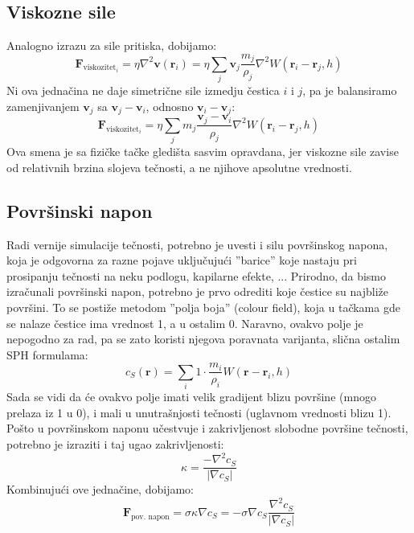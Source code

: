 \documentclass[12pt]{article}
\renewcommand{\vec}[1]{\mathbf{#1}}
\begin{document}
    \subsection{Viskozne sile}
        Analogno izrazu za sile pritiska, dobijamo:
        \begin{equation}\label{eq:SPH interpolacija sile viskoziteta (original)}
        \vec{F}_{\text{viskozitet}_i} = \eta\nabla^2 \vec{v}(\vec{r}_i)=\eta\sum_j \vec{v}_j \frac{m_j}{\rho_j}\nabla^2 W(\vec{r}_i-\vec{r}_j, h)
        \end{equation}
        Ni ova jedna\v cina ne daje simetri\v cne sile izmedju \v cestica $i$ i $j$, pa je balansiramo zamenjivanjem $\vec{v}_j$ sa $\vec{v}_j-\vec{v}_i$, odnosno $\vec{v}_i-\vec{v}_j$:
        \begin{equation}\label{eq:SPH interpolacija sile viskoziteta (simetricno)}
        \vec{F}_{\text{viskozitet}_i}=\eta\sum_j m_j \frac{\vec{v}_j-\vec{v}_i}{\rho_j}\nabla^2 W(\vec{r}_i-\vec{r}_j, h)
        \end{equation}
        Ova smena je sa fizi\v cke ta\v cke gledi\v sta sasvim opravdana, jer viskozne sile zavise od relativnih brzina slojeva te\v cnosti, a ne njihove apsolutne vrednosti.
    \subsection{Povr\v sinski napon}
        Radi vernije simulacije te\v cnosti, potrebno je uvesti i silu povr\v sinskog napona, koja je odgovorna za razne pojave uklju\v cuju\'ci ''barice'' koje nastaju pri prosipanju te\v cnosti na neku podlogu, kapilarne efekte, ... Prirodno, da bismo izra\v cunali povr\v sinski napon, potrebno je prvo odrediti koje \v cestice su najbli\v ze povr\v sini. To se posti\v ze metodom ''polja boja'' (colour field), koja u ta\v ckama gde se nalaze \v cestice ima vrednost 1, a u ostalim 0. Naravno, ovakvo polje je nepogodno za rad, pa se zato koristi njegova poravnata varijanta, sli\v cna ostalim SPH formulama:
        \begin{equation}\label{eq:SPH interpolacija polja boja}
        c_S(\vec{r}) = \sum_i 1\cdot\frac{m_i}{\rho_i}W(\vec{r}-\vec{r}_i, h)
        \end{equation}
        Sada se vidi da \'ce ovakvo polje imati velik gradijent blizu povr\v sine (mnogo prelaza iz 1 u 0), i mali u unutra\v snjosti te\v cnosti (uglavnom vrednosti blizu 1). Po\v sto u povr\v sinskom naponu u\v cestvuje i zakrivljenost slobodne povr\v sine te\v cnosti, potrebno je izraziti i taj ugao zakrivljenosti:
        \begin{equation}\label{eq:SPH ugao zakrivljenosti}
        \kappa = \frac{-\nabla^2c_S}{|\nabla c_S|}
        \end{equation}
        Kombinuju\'ci ove jedna\v cine, dobijamo:
        \begin{equation}\label{eq:SPH interpolacija sile povrsinskog napona}
        \vec{F}_{\text{pov. napon}} = \sigma\kappa\nabla c_S = -\sigma \nabla c_S \frac{\nabla^2 c_S}{|\nabla c_S|}
        \end{equation}
\end{document}
